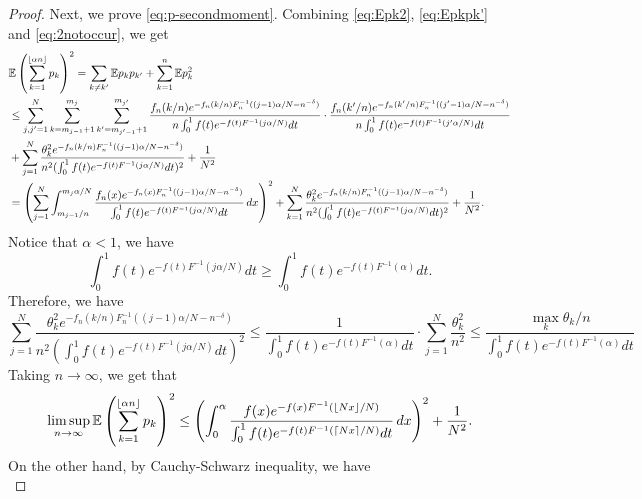 \documentclass[10pt]{article}
\numberwithin{equation}{section}
\begin{document}
\begin{proof}
        Next, we prove \eqref{eq:p-secondmoment}. Combining \eqref{eq:Epk2}, \eqref{eq:Epkpk'} and \eqref{eq:2notoccur}, we get
        \begin{align}
            &\mathbb E\left(\sum_{k=1}^{\lfloor \alpha n \rfloor} p_k \right)^2 = \sum_{k\neq k'} \mathbb Ep_kp_{k'}+ \sum_{k=1}^n \mathbb Ep_k^2 \\
            & \leq \sum_{j,j'=1}^N \sum_{k=m_{j-1}+1}^{m_j} \sum_{k'=m_{j'-1}+1}^{m_{j'}} \frac{f_n(k/n)e^{-f_n(k/n) F_n^{-1}((j-1)\alpha/N-n^{-\delta})}}{n\int_0^1f(t)e^{-f(t)F^{-1}(j\alpha/N)}dt} \cdot \frac{f_n(k'/n)e^{-f_n(k'/n) F_n^{-1}((j'-1)\alpha/N-n^{-\delta})}}{n\int_0^1f(t)e^{-f(t)F^{-1}(j'\alpha/N)}dt}
            \\
            &+\sum_{j=1}^N \frac{\theta_k^2e^{-f_n(k/n) F_n^{-1}((j-1)\alpha/N-n^{-\delta})}}{n^2(\int_0^1f(t)e^{-f(t)F^{-1}(j\alpha/N)}dt)^2} + \frac{1}{N^2} \\
            &=\left(\sum_{j=1}^N  \int_{m_{j-1}/n}^{m_j\alpha/N} \frac{f_n(x)e^{-f_n(x) F_n^{-1}((j-1)\alpha/N-n^{-\delta})}}{\int_0^1f(t)e^{-f(t)F^{-1}(j\alpha/N)}dt} \, dx \right)^2 +\sum_{k=1}^N \frac{\theta_k^2e^{-f_n(k/n) F_n^{-1}((j-1)\alpha/N-n^{-\delta})}}{n^2(\int_0^1f(t)e^{-f(t)F^{-1}(j\alpha/N)}dt)^2} + \frac{1}{N^2}.
        \end{align}
        Notice that $\alpha<1$, we have
        \begin{equation}
            \int_0^1f(t)e^{-f(t)F^{-1}(j\alpha/N)}dt \geq \int_0^1f(t)e^{-f(t)F^{-1}(\alpha)}dt.
        \end{equation}
        Therefore, we have
        \begin{equation}
            \sum_{j=1}^N \frac{\theta_k^2e^{-f_n(k/n) F_n^{-1}((j-1)\alpha/N-n^{-\delta})}}{n^2(\int_0^1f(t)e^{-f(t)F^{-1}(j\alpha/N)}dt)^2} \leq \frac{1}{\int_0^1f(t)e^{-f(t)F^{-1}(\alpha)}dt} \cdot \sum_{j=1}^N \frac{\theta_k^2}{n^2}\leq \frac{\max_k \theta_k/n}{\int_0^1f(t)e^{-f(t)F^{-1}(\alpha)}dt} 
        \end{equation}
        Taking $n\to \infty$, we get that
        \begin{equation}
            \limsup_{n\to \infty} \mathbb E\left(\sum_{k=1}^{\lfloor \alpha n \rfloor} p_k \right)^2  \leq \left( \int_0^\alpha \frac{f(x)e^{-f(x)F^{-1}(\lfloor Nx\rfloor/N)}}{\int_0^1f(t)e^{-f(t)F^{-1}(\lceil Nx\rceil/N)}dt} \,dx \right)^2 +\frac{1}{N^2}.
        \end{equation}
        On the other hand, by Cauchy-Schwarz inequality, we have
        \begin{equation}\label{eq:2ndmoment-upper}

\end{equation}
\end{proof}
\end{document}
